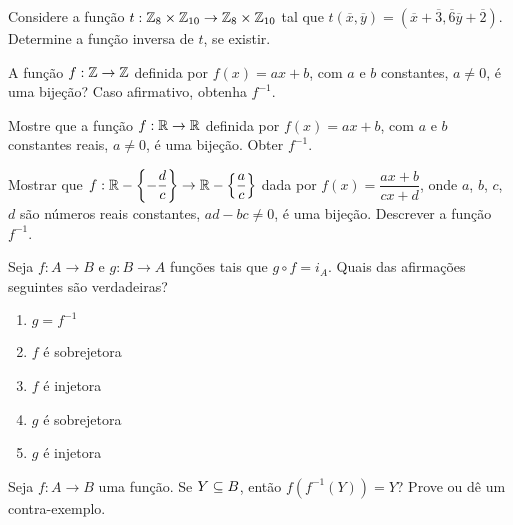 \documentclass[12pt]{exam}
\begin{document}
    \vspace{.3cm}

    \questao{} Considere a fun{\c c}{\~a}o $t : \mathbb{Z}_8 \times \mathbb{Z}_{10} \to \mathbb{Z}_8 \times \mathbb{Z}_{10}$ tal que $t(\overline{x},\overline{y}) = (\overline{x} + \overline{3}, \overline{6}\overline{y} + \overline{2})$. Determine a fun\c{c}\~ao inversa de $t$, se existir.

    \vspace{.3cm}

    \questao{} A fun{\c c}{\~a}o $f : \mathbb{Z} \to \mathbb{Z}$ definida por $f(x) = ax + b$, com $a$ e $b$ constantes, $a \ne 0$, {\'e} uma bije{\c c}{\~a}o? Caso afirmativo, obtenha $f^{-1}$.

    \vspace{.3cm}


    \questao{} Mostre que a fun{\c c}{\~a}o $f : \mathbb{R} \to \mathbb{R}$ definida por $f(x) = ax + b$, com $a$ e $b$ constantes reais, $a \ne 0$, {\'e} uma bije{\c c}{\~a}o. Obter $f^{-1}$.

    \vspace{.3cm}

    \questao{} Mostrar que $f : \mathbb{R} - \left\{-\dfrac{d}{c}\right\} \to \mathbb{R}  - \left\{\dfrac{a}{c}\right\}$ dada por $f(x) =  \dfrac{ax + b}{cx + d}$, onde $a$, $b$, $c$, $d$ s{\~a}o n{\'u}meros reais constantes, $ad - bc \ne 0$, {\'e} uma bije{\c c}{\~a}o. Descrever a fun{\c c}{\~a}o $f^{-1}$.

    \vspace{.3cm}

    \questao{} Seja $f : A \to B$ e $g : B \to A$ fun\c{c}\~oes tais que $g \circ f = i_A$. Quais das afirma\c{c}\~oes seguintes s\~ao verdadeiras?
    \begin{enumerate}[label={\alph*})]
        \item $g = f^{-1}$

        \item $f$ \'e sobrejetora

        \item $f$ \'e injetora

        \item $g$ \'e sobrejetora

        \item $g$ \'e injetora
    \end{enumerate}

    \vspace{.3cm}

    \questao{} Seja $f : A \to B$ uma fun\c{c}\~ao. Se $Y \subseteq B$, ent\~ao $f(f^{-1}(Y)) = Y$? Prove ou d\^e um contra-exemplo.
\end{document}
